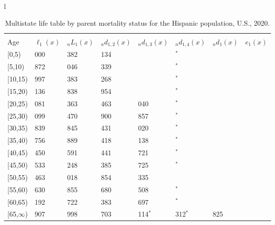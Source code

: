 \documentclass[
]{article}
\begin{document}
\begin{table}
\caption{\label{tab:table-hispanic}Multistate life table by parent mortality status for the Hispanic population, U.S., 2020.}

\centering
\fontsize{9}{11}\selectfont
\begin{tabular}[t]{l}
\hline
\begin{tabular}{>{\raggedright\arraybackslash}p{.45in}>{\raggedleft\arraybackslash}p{.65in}>{\raggedleft\arraybackslash}p{.65in}>{\raggedleft\arraybackslash}p{.65in}>{\raggedleft\arraybackslash}p{.65in}>{\raggedleft\arraybackslash}p{.65in}>{\raggedleft\arraybackslash}p{.65in}>{\raggedleft\arraybackslash}p{.65in}}
\toprule
\multicolumn{1}{c}{ } & \multicolumn{7}{c}{(1) Lost neither} \\
\cmidrule(l{3pt}r{3pt}){2-8}
Age & $\ell_{1}(x)$ & ${}_nL_{1}(x)$ & ${}_nd_{1,2}(x)$ & ${}_nd_{1,3}(x)$ & ${}_nd_{1,4}(x)$ & ${}_nd_{1}(x)$ & $e_{1}(x)$\\
\midrule
{}[0,5) & 100 000 & 494 382 & 1 134 & 368 & 89$^{*}$ & 537 & 44\\
{}[5,10) & 97 872 & 485 046 & 1 339 & 493 & 0$^{*}$ & 44 & 39\\
{}[10,15) & 95 997 & 474 383 & 1 268 & 501 & 24$^{*}$ & 68 & 34\\
{}[15,20) & 94 136 & 460 838 & 1 954 & 815 & 42$^{*}$ & 246 & 29\\
{}[20,25) & 91 081 & 440 363 & 2 463 & 1 040 & 53$^{*}$ & 426 & 25\\
\addlinespace
{}[25,30) & 87 099 & 412 470 & 2 900 & 1 857 & 0$^{*}$ & 503 & 20\\
{}[30,35) & 81 839 & 375 845 & 3 431 & 2 020 & 85$^{*}$ & 548 & 16\\
{}[35,40) & 75 756 & 334 889 & 5 418 & 2 138 & 145$^{*}$ & 604 & 13\\
{}[40,45) & 67 450 & 280 591 & 5 441 & 2 721 & 99$^{*}$ & 656 & 9\\
{}[45,50) & 58 533 & 224 248 & 6 385 & 2 725 & 201$^{*}$ & 760 & 6\\
\addlinespace
{}[50,55) & 48 463 & 160 018 & 6 854 & 3 335 & 826 & 819 & 4\\
{}[55,60) & 36 630 & 97 855 & 5 680 & 2 508 & 474$^{*}$ & 776 & 2\\
{}[60,65) & 27 192 & 52 722 & 3 383 & 2 697 & 578$^{*}$ & 627 & 1\\
{}[65,$\infty$) & 19 907 & 71 998 & 5 703 & 2 114$^{*}$ & 2 312$^{*}$ & 3 825 & 1\\
\end{tabular}\\

\end{tabular}
\end{table}
\end{document}
